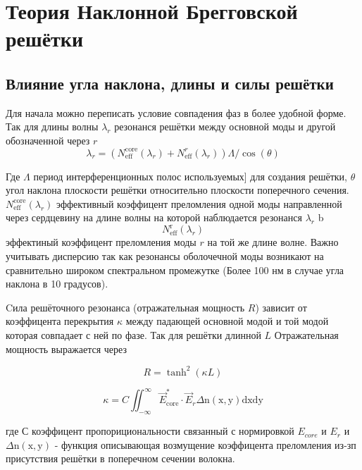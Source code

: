 \section{Теория Наклонной Брегговской решётки}
\subsection{Влияние угла наклона, длины и силы решётки}
 Для начала можно  переписать условие совпадения фаз в более удобной форме.
 Так для длины волны $ \lambda_{r} $ резонанся решётки между основной моды и другой обозначенной через $ r $
$$\lambda_{r}=\left(N_{\mathrm{eff}}^{\mathrm{core}}\left(\lambda_{r}\right)+N_{\mathrm{eff}}^{r}\left(\lambda_{r}\right)\right) \Lambda / \cos (\theta)$$

 Где $ \Lambda $ период интерференционных полос используемых] для создания решётки, $ \theta $ угол наклона плоскости решётки относительно плоскости поперечного сечения.
 $N_{\mathrm{eff}}^{\mathrm{core}}\left(\lambda_{r}\right)$ эффективный коэффицент преломления одной моды направленной через сердцевину на длине волны на которой наблюдается резонанся $ \lambda_{r} $ b $$N_{\mathrm{eff}}^{\mathrm{r}}\left(\lambda_{r}\right)$$ эффектиный коэффицент преломления моды $ r $ на той же длине волне. Важно учитывать дисперсию так как резонансы оболочечной моды возникают на сравнительно широком спектральном промежутке (Более 100 нм в случае угла наклона в 10 градусов).
 
\par
Cила решёточного резонанса (отражательная мощность $ R $) зависит от коэффицента перекрытия $ \kappa $ между 
падающей основной модой и той модой которая совпадает с ней по фазе.
Так для решётки длинной $ L $ Отражательная мощность выражается через




$$R=\tanh ^{2}(\kappa L)$$


$$\kappa=C \iint_{-\infty}^{\infty} \vec{E}_{\mathrm{core}}^{*} \cdot \vec{E}_{r} \Delta \mathrm{n}(\mathrm{x}, \mathrm{y}) \mathrm{d} \mathrm{xdy}$$


где $ С $ коэффицент пропорициональности связанный с нормировкой $ E_{core} $ и $ E_{r}$ и  $\Delta \mathrm{n}(\mathrm{x}, \mathrm{y})$ - функция описывающая возмущение коэффицента преломления из-зп присутствия решётки в поперечном сечении волокна.


